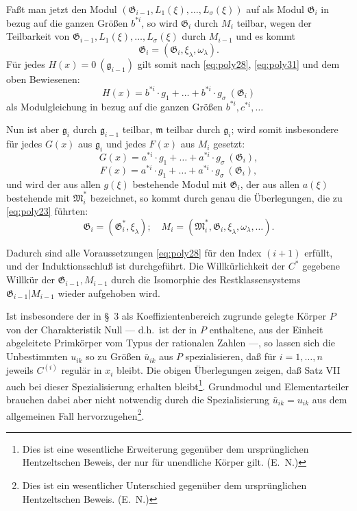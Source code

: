 \documentclass[fontsize=10pt,paper=a5,pagesize,headings=small]{scrbook}
\newcommand{\ideal}[1]{\mathfrak{#1}}
\theoremstyle{plain}
\begin{document}
\newpage
\setcounter{page}{439}

Faßt man jetzt den Modul $(\mathfrak{G}_{i-1}, L_1(\xi),\dots,L_\sigma(\xi))$ auf als Modul $\mathfrak{G}_i$
in bezug auf die ganzen Größen $b^{*i}$, so wird $\mathfrak{G}_i$ durch $M_i$ teilbar, wegen der
Teilbarkeit von $\mathfrak{G}_{i-1}, L_1(\xi),\dots,L_\sigma(\xi)$ durch $M_{i-1}$ und es kommt
\[ \mathfrak{G}_i = (\mathfrak{G}_i, \xi_\lambda, \omega_\lambda). \]
Für jedes $H(x) = 0\ (\ideal{g}_{i-1})$ gilt somit nach \eqref{eq:poly28}, \eqref{eq:poly31} und dem
oben Bewiesenen:
\[ H(x) = b^{*i} \cdot g_1 + \dots + b^{*i} \cdot g_\sigma\ (\mathfrak{G}_i) \]
als Modulgleichung in bezug auf die ganzen Größen $b^{*i}, c^{*i},\dots$

Nun ist aber $\ideal{g}_i$ durch $\ideal{g}_{i-1}$ teilbar, $\ideal{m}$ teilbar durch $\ideal{g}_i$; wird somit insbesondere
für jedes $G(x)$ aus $\ideal{g}_i$ und jedes $F(x)$ aus $M_i$ gesetzt:
\[ G(x) = a^{*i} \cdot g_1 + \dots + a^{*i} \cdot g_\sigma\ (\mathfrak{G}_i), \]
\[ F(x) = a^{*i} \cdot g_1 + \dots + a^{*i} \cdot g_\sigma\ (\mathfrak{G}_i), \]
und wird der aus allen $g(\xi)$ bestehende Modul mit $\mathfrak{G}_i$, der aus allen $a(\xi)$ bestehende
mit $\mathfrak{M}_i^*$ bezeichnet, so kommt durch genau die Überlegungen, die zu \eqref{eq:poly23}
führten:
\begin{equation}
\label{eq:poly32}
\mathfrak{G}_i = (\mathfrak{G}_i^*, \xi_\lambda);\quad M_i = (\mathfrak{M}_i^*, \mathfrak{G}_i, \xi_\lambda, \omega_\lambda,\dots).
\end{equation}

\newpage
\setcounter{page}{440}

Dadurch sind alle Voraussetzungen \eqref{eq:poly28} für den Index $(i+1)$ erfüllt,
und der Induktionsschluß ist durchgeführt. Die Willkürlichkeit der $C^*$ gegebene
Willkür der $\mathfrak{G}_{i-1}, M_{i-1}$ durch die Isomorphie des Restklassensystems $\mathfrak{G}_{i-1}|M_{i-1}$
wieder aufgehoben wird.

Ist insbesondere der in \S~3 als Koeffizientenbereich zugrunde gelegte Körper $P$
von der Charakteristik Null --- d.h.~ist der in $P$ enthaltene, aus der Einheit abgeleitete
Primkörper vom Typus der rationalen Zahlen ---, so lassen sich die Unbestimmten
$u_{ik}$ so zu Größen $\bar{u}_{ik}$ aus $P$ spezialisieren, daß für $i=1,\dots,n$ jeweils $C^{(i)}$
regulär in $x_i$ bleibt. Die obigen Überlegungen zeigen, daß Satz VII auch bei dieser
Spezialisierung erhalten bleibt\footnote{Dies ist eine wesentliche Erweiterung gegenüber
dem ursprünglichen Hentzeltschen Beweis, der nur für unendliche Körper gilt. (E.~N.)}.
Grundmodul und Elementarteiler brauchen dabei aber nicht notwendig durch die
Spezialisierung $\bar{u}_{ik} = u_{ik}$ aus dem allgemeinen Fall hervorzugehen\footnote{Dies
ist ein wesentlicher Unterschied gegenüber dem ursprünglichen Hentzeltschen Beweis. (E.~N.)}.
\end{document}
